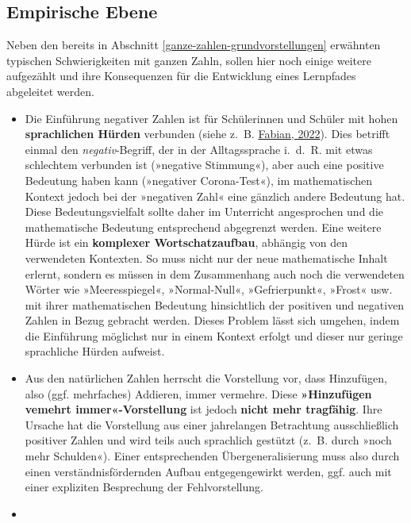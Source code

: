 \documentclass[
]{scrbook}
\providecommand{\tightlist}{%
  \setlength{\itemsep}{0pt}\setlength{\parskip}{0pt}}
\theoremstyle{definition}
\theoremstyle{definition}
\theoremstyle{definition}
\theoremstyle{definition}
\theoremstyle{remark}
\begin{document}
\hypertarget{ganze-zahlen-empirische-ebene}{%
\subsection{Empirische Ebene}\label{ganze-zahlen-empirische-ebene}}

Neben den bereits in Abschnitt \ref{ganze-zahlen-grundvorstellungen} erwähnten typischen Schwierigkeiten mit ganzen Zahln, sollen hier noch einige weitere aufgezählt und ihre Konsequenzen für die Entwicklung eines Lernpfades abgeleitet werden.

\begin{itemize}
\tightlist
\item
  Die Einführung negativer Zahlen ist für Schülerinnen und Schüler mit hohen \textbf{sprachlichen Hürden} verbunden (siehe z.~B. \protect\hyperlink{ref-Fabian2022}{Fabian, 2022}). Dies betrifft einmal den \emph{negativ}-Begriff, der in der Alltagssprache i.~d.~R. mit etwas schlechtem verbunden ist (»negative Stimmung«), aber auch eine positive Bedeutung haben kann (»negativer Corona-Test«), im mathematischen Kontext jedoch bei der »negativen Zahl« eine gänzlich andere Bedeutung hat. \textcolor{empiricColor}{Diese Bedeutungsvielfalt sollte daher im Unterricht angesprochen und die mathematische Bedeutung entsprechend abgegrenzt werden.} Eine weitere Hürde ist ein \textbf{komplexer Wortschatzaufbau}, abhängig von den verwendeten Kontexten. So muss nicht nur der neue mathematische Inhalt erlernt, sondern es müssen in dem Zusammenhang auch noch die verwendeten Wörter wie »Meeresspiegel«, »Normal-Null«, »Gefrierpunkt«, »Frost« usw. mit ihrer mathematischen Bedeutung hinsichtlich der positiven und negativen Zahlen in Bezug gebracht werden. \textcolor{empiricColor}{Dieses Problem lässt sich umgehen, indem die Einführung möglichst nur in einem Kontext erfolgt und dieser nur geringe sprachliche Hürden aufweist.}
\item
  Aus den natürlichen Zahlen herrscht die Vorstellung vor, dass Hinzufügen, also (ggf. mehrfaches) Addieren, immer vermehre. Diese \textbf{»Hinzufügen vemehrt immer«-Vorstellung} ist jedoch \textbf{nicht mehr tragfähig}. Ihre Ursache hat die Vorstellung aus einer jahrelangen Betrachtung ausschließlich positiver Zahlen und wird teils auch sprachlich gestützt (z.~B. durch »noch mehr Schulden«). \textcolor{empiricColor}{Einer entsprechenden Übergeneralisierung muss also durch einen verständnisfördernden Aufbau entgegengewirkt werden, ggf. auch mit einer expliziten Besprechung der Fehlvorstellung.}
\item

\end{itemize}
\end{document}
